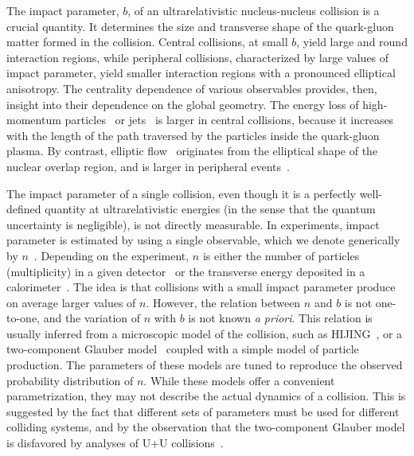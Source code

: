 \documentclass[aps,prc,twocolumn,superscriptaddress,showpacs,floatfix,nofootinbib]{revtex4-1}
\begin{document}
The impact parameter, $b$, of an ultrarelativistic nucleus-nucleus collision is a crucial quantity. 
It determines the size and transverse shape of the quark-gluon matter formed in the collision. 
Central collisions, at small $b$, yield large and round interaction regions, while peripheral collisions, characterized by large values of impact parameter, yield smaller interaction regions with a pronounced elliptical anisotropy.
The centrality dependence of various observables provides, then, insight into their dependence on the global geometry. 
The energy loss of high-momentum particles~\cite{Adler:2002xw,Abelev:2006db} or jets~\cite{Aad:2010bu} is larger in central collisions, because it increases with the length of the path traversed by the particles inside the quark-gluon plasma.
By contrast, elliptic flow~\cite{Ackermann:2000tr,Aamodt:2010pa} originates from the elliptical shape of the nuclear overlap region, and is larger in peripheral events~\cite{Ollitrault:1992bk}. 

The impact parameter of a single collision, even though it is a perfectly well-defined quantity at ultrarelativistic energies (in the sense that the quantum uncertainty is negligible), is not directly measurable. 
In experiments, impact parameter is estimated by using a single observable, which we denote generically by $n$~\cite{Broniowski:2001ei}.
Depending on the experiment, $n$ is either the number of particles (multiplicity) in a given detector~\cite{Back:2000gw,Adler:2001yq,Adler:2004zn,Abelev:2013qoq} or the transverse energy deposited in a calorimeter~\cite{Chatrchyan:2011pb,ATLAS:2011ah}.
The idea is that collisions with a small impact parameter produce on average larger values of $n$. 
However, the relation between $n$ and $b$ is not one-to-one, and the variation of $n$ with $b$ is not known \textit{a priori}. 
This relation is usually inferred from a microscopic model of the  collision, such as {\scriptsize HIJING}~\cite{Wang:1991hta}, or a two-component Glauber model~\cite{Miller:2007ri} coupled with a simple model of particle production. 
The parameters of these models are tuned to reproduce the observed probability distribution of $n$.
While these models offer a convenient parametrization, they may not describe the actual dynamics of a collision. 
This is suggested by the fact that different sets of parameters must be used for different colliding systems, and by the observation that the two-component Glauber model is disfavored by analyses of U+U collisions~\cite{Adamczyk:2015obl,Moreland:2014oya}.
\end{document}
